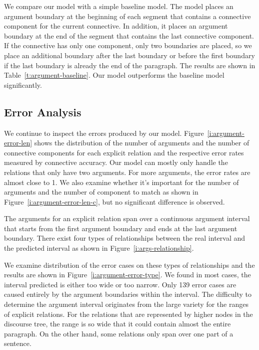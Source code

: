 

We compare our model with a simple baseline model. The model places an argument
boundary at the beginning of each segment that contains a connective component for
the current connective. In addition, it places an argument boundary at the
end of the segment that contains the last connective component. If the connective
has only one component, only two boundaries are placed, so we place an additional
boundary after the last boundary or before the first boundary if
the last boundary is already the end of the paragraph. The results are shown
in Table~\ref{t:argument-baseline}. Our model outperforms the baseline model
significantly.



\subsection{Error Analysis}

We continue to inspect the errors produced by our model.
Figure~\ref{i:argument-error-len} shows the distribution of the number
of arguments and the number of connective components for each explicit relation
and the respective error rates measured by connective accuracy.
Our model can mostly only handle the relations
that only have two arguments. For more arguments, the error rates are almost
close to 1. We also examine whether it's important for
the number of arguments and the number of component to match as shown in
Figure~\ref{i:argument-error-len-c}, but no significant difference is observed.



The arguments for an explicit relation span over a continuous argument interval that
starts from the first argument boundary and ends at the last argument boundary.
There exist four types of relationships between the real interval and the predicted
interval as shown in Figure~\ref{i:args-relationship}.



We examine distribution of the error cases on these types of relationships and the
results are shown in Figure~\ref{i:argument-error-type}. We found in most cases,
the interval predicted is either too wide or too narrow.
Only 139 error cases are caused entirely by the argument boundaries within the
interval. The difficulty to determine the argument interval originates from
the large variety for the ranges of explicit relations. For the relations that
are represented by higher nodes in the discourse tree,
the range is so wide that it could contain almost the entire paragraph.
On the other hand, some relations only span over one part of a sentence.

